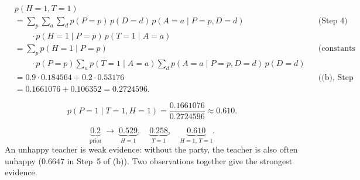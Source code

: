\begin{solution}
\begin{align*}
  &p(H = 1, T = 1) \\
  &= \sum_{p} \sum_{a} \sum_{d} p(P = p) \, p(D = d) \,
     p(A = a \mid P = p, D = d)
    && \text{(Step 4)} \\
  &\qquad \cdot p(H = 1 \mid P = p) \, p(T = 1 \mid A = a) \\
  &= \sum_{p} p(H = 1 \mid P = p)
    && \text{(constants out)} \\
  &\qquad \cdot p(P = p) \sum_{a} p(T = 1 \mid A = a)
     \sum_{d} p(A = a \mid P = p, D = d) \, p(D = d) \\
  &= 0.9 \cdot 0.184564 + 0.2 \cdot 0.53176
    && \text{((b), Step 5)} \\
  &= 0.1661076 + 0.106352
   = 0.2724596.
\end{align*}

\[
  p(P = 1 \mid T = 1, H = 1)
  = \frac{0.1661076}{0.2724596}
  \approx 0.610.
\]

\[
  \underbrace{0.2}_{\text{prior}}
  \;\to\;
  \underbrace{0.529}_{H = 1}, \quad
  \underbrace{0.258}_{T = 1}, \quad
  \underbrace{0.610}_{H = 1,\, T = 1}.
\]
An unhappy teacher is weak evidence: without the party, the teacher is
also often unhappy ($0.6647$ in Step~5 of (b)). Two observations together give the strongest evidence.
\end{solution}
